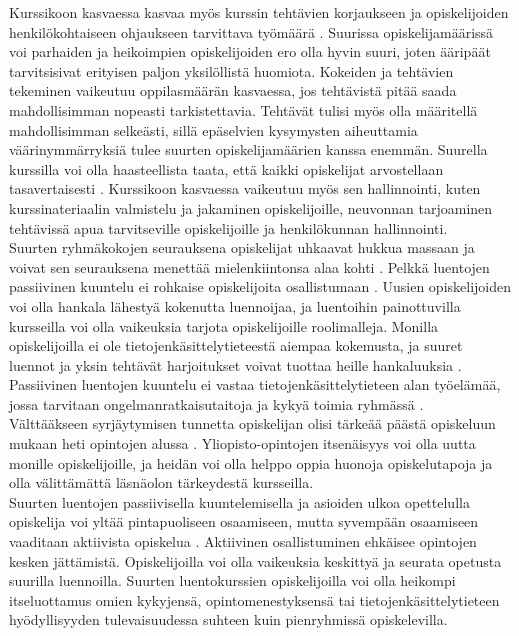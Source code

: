 \documentclass[finnish]{tktltiki2}
\theoremstyle{definition}
\theoremstyle{remark}
\begin{document}
Kurssikoon kasvaessa kasvaa myös kurssin tehtävien korjaukseen ja opiskelijoiden henkilökohtaiseen ohjaukseen tarvittava työmäärä \cite{Kay98}. Suurissa opiskelijamäärissä voi parhaiden ja heikoimpien opiskelijoiden ero olla hyvin suuri, joten ääripäät tarvitsisivat erityisen paljon yksilöllistä huomiota. Kokeiden ja tehtävien tekeminen vaikeutuu oppilasmäärän kasvaessa, jos tehtävistä pitää saada mahdollisimman nopeasti tarkistettavia. Tehtävät tulisi myös olla määritellä mahdollisimman selkeästi, sillä epäselvien kysymysten aiheuttamia väärinymmärryksiä tulee suurten opiskelijamäärien kanssa enemmän. Suurella kurssilla voi olla haasteellista taata, että kaikki opiskelijat arvostellaan tasavertaisesti \cite{Chamillard02}. Kurssikoon kasvaessa vaikeutuu myös sen hallinnointi, kuten kurssinateriaalin valmistelu ja jakaminen opiskelijoille, neuvonnan tarjoaminen tehtävissä apua tarvitseville opiskelijoille ja henkilökunnan hallinnointi. 
\\
Suurten ryhmäkokojen seurauksena opiskelijat uhkaavat hukkua massaan ja voivat sen seurauksena menettää mielenkiintonsa alaa kohti \cite{Kay98}. Pelkkä luentojen passiivinen kuuntelu ei rohkaise opiskelijoita osallistumaan \cite{Kopp00}. Uusien opiskelijoiden voi olla hankala lähestyä kokenutta luennoijaa, ja luentoihin painottuvilla kursseilla voi olla vaikeuksia tarjota opiskelijoille roolimalleja. Monilla opiskelijoilla ei ole tietojenkäsittelytieteestä aiempaa kokemusta, ja suuret luennot ja yksin tehtävät harjoitukset voivat tuottaa heille hankaluuksia \cite{Murphy11}. Passiivinen luentojen kuuntelu ei vastaa tietojenkäsittelytieteen alan työelämää, jossa tarvitaan ongelmanratkaisutaitoja ja kykyä toimia ryhmässä \cite{Vihavainen}.
\\
Välttääkseen syrjäytymisen tunnetta opiskelijan olisi tärkeää päästä opiskeluun mukaan heti opintojen alussa \cite{Settle12}. Yliopisto-opintojen itsenäisyys voi olla uutta monille opiskelijoille, ja heidän voi olla helppo oppia huonoja opiskelutapoja ja olla välittämättä läsnäolon tärkeydestä kursseilla.
\\
Suurten luentojen passiivisella kuuntelemisella ja asioiden ulkoa opettelulla opiskelija voi yltää pintapuoliseen osaamiseen, mutta syvempään osaamiseen vaaditaan aktiivista opiskelua \cite{Boyer07}. Aktiivinen osallistuminen ehkäisee opintojen kesken jättämistä. Opiskelijoilla voi olla vaikeuksia keskittyä ja seurata opetusta suurilla luennoilla. Suurten luentokurssien opiskelijoilla voi olla heikompi itseluottamus omien kykyjensä, opintomenestyksensä tai tietojenkäsittelytieteen hyödyllisyyden tulevaisuudessa suhteen kuin pienryhmissä opiskelevilla.
\end{document}
